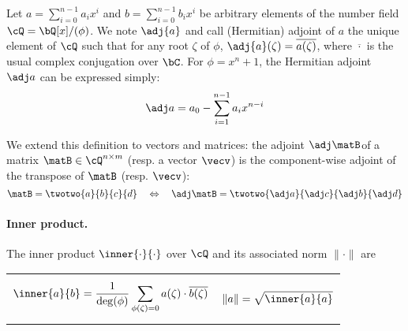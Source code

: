 Let $a =\sum_{i=0}^{n-1} a_i x^i$ and $b =\sum_{i=0}^{n-1} b_i x^i$ be arbitrary elements of the number field $\cQ = \bQ[x]/(\phi)$. 
 We note $\adj{a}$ and call (Hermitian) adjoint of $a$ the unique element of $\cQ$ such that for any root $\zeta$ of $\phi$, $\adj{a}(\zeta) = \overline{a(\zeta)}$, where $\overline{\cdot}$ is the usual complex conjugation over $\bC$. For $\phi = x^n+1$, the Hermitian adjoint $\adj a$ can be expressed simply:
 \begin{equation}
 \adj a = a_0 - \sum_{i=1}^{n-1} a_{i} x^{n-i}
 \end{equation}

We extend this definition to vectors and matrices: the adjoint $\adj\matB$of a matrix $\matB \in \cQ^{n\times m}$ (resp. a vector $\vecv$) is the component-wise adjoint of the transpose of $\matB$ (resp. $\vecv$):
\begin{equation}
\matB = \twotwo{a}{b}{c}{d} \quad \Leftrightarrow \quad \adj \matB = \twotwo{\adj a}{\adj c}{\adj b}{\adj d}
\end{equation}

\paragraph{Inner product.} The inner product $\inner{\cdot}{\cdot}$ over $\cQ$ and its associated norm $\|\cdot\|$ are

\noindent
\begin{tabular}{@{}p{.5\linewidth}@{}p{.5\linewidth}@{}}
	\begin{equation}\label{eq:innerfft}
	\inner{a}{b} = \frac{1}{\deg(\phi)}\sum_{\phi(\zeta)=0} a(\zeta)\cdot \overline{b(\zeta)}
	\end{equation}
	&
	\begin{equation}\label{eq:norm}
	\|a\| = \sqrt{\inner{a}{a}}
	\end{equation}
\end{tabular}

